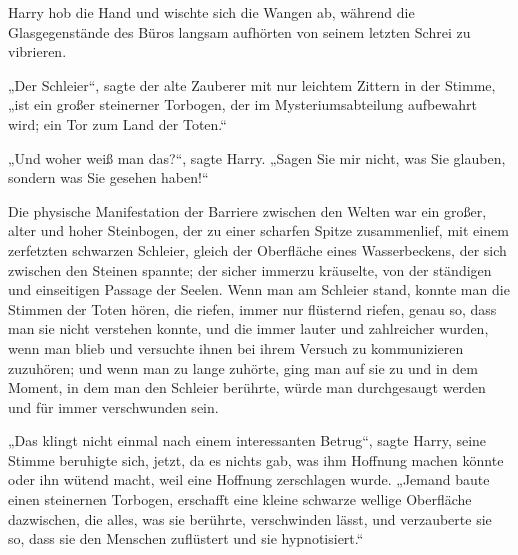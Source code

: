 Harry hob die Hand und wischte sich die Wangen ab, während die Glasgegenstände des Büros langsam aufhörten von seinem letzten Schrei zu vibrieren.

„Der Schleier“, sagte der alte Zauberer mit nur leichtem Zittern in der Stimme, „ist ein großer steinerner Torbogen, der im Mysteriumsabteilung aufbewahrt wird; ein Tor zum Land der Toten.“

„Und woher weiß man das?“, sagte Harry.
„Sagen Sie mir nicht, was Sie glauben, sondern was Sie gesehen haben!“

Die physische Manifestation der Barriere zwischen den Welten war ein großer, alter und hoher Steinbogen, der zu einer scharfen Spitze zusammenlief, mit einem zerfetzten schwarzen Schleier, gleich der Oberfläche eines Wasserbeckens, der sich zwischen den Steinen spannte; der sicher immerzu kräuselte, von der ständigen und einseitigen Passage der Seelen. Wenn man am Schleier stand, konnte man die Stimmen der Toten hören, die riefen, immer nur flüsternd riefen, genau so, dass man sie nicht verstehen konnte, und die immer lauter und zahlreicher wurden, wenn man blieb und versuchte ihnen bei ihrem Versuch zu kommunizieren zuzuhören; und wenn man zu lange zuhörte, ging man auf sie zu und in dem Moment, in dem man den Schleier berührte, würde man durchgesaugt werden und für immer verschwunden sein.

„Das klingt nicht einmal nach einem interessanten Betrug“, sagte Harry, seine Stimme beruhigte sich, jetzt, da es nichts gab, was ihm Hoffnung machen könnte oder ihn wütend macht, weil eine Hoffnung zerschlagen wurde.
„Jemand baute einen steinernen Torbogen, erschafft eine kleine schwarze wellige Oberfläche dazwischen, die alles, was sie berührte, verschwinden lässt, und verzauberte sie so, dass sie den Menschen zuflüstert und sie hypnotisiert.“

